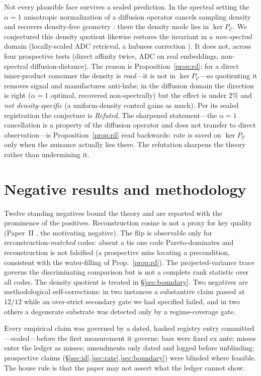 \documentclass[lettersize,onecolumn]{IEEEtran}
\theoremstyle{definition}
\theoremstyle{remark}
\newcommand{\PC}{P_{\mathcal{C}}}
\begin{document}
Not every plausible face survives a sealed prediction. In the spectral setting the
$\alpha{=}1$ anisotropic normalization of a diffusion operator cancels sampling
density and recovers density-free geometry \cite{coifman2006}: there the density mode
lies in $\ker\PC$. We conjectured this density quotient likewise restores the
invariant in a \emph{non-spectral} domain (locally-scaled ADC retrieval, a hubness
correction \cite{radovanovic2010}). It does not, across four prospective tests
(direct affinity twice, ADC on real embeddings, non-spectral diffusion-distance).
The reason is Proposition~\ref{prop:rd}: for a direct inner-product consumer the
density is \emph{read}---it is not in $\ker\PC$---so quotienting it removes signal and
manufactures anti-hubs; in the diffusion domain the direction is right ($\alpha{=}1$
optimal, recovered non-spectrally) but the effect is under $2\%$ and \emph{not
density-specific} (a uniform-density control gains as much). Per its sealed
registration the conjecture is \emph{Refuted}. The sharpened statement---the
$\alpha{=}1$ cancellation is a property of the diffusion operator and does not
transfer to direct observation---is Proposition~\ref{prop:rd} read backwards: rate is
saved on $\ker\PC$ only when the nuisance actually lies there. The refutation
sharpens the theory rather than undermining it.

\section{Negative results and methodology}\label{sec:negatives}

Twelve standing negatives bound the theory and are reported with the prominence of
the positives. Reconstruction cosine is not a proxy for key quality (Paper~II
\cite{paper2}, the motivating negative). The flip is observable only for
reconstruction-\emph{matched} codes: absent a tie one code Pareto-dominates and
reconstruction is not falsified (a prospective miss locating a precondition,
consistent with the water-filling of Prop.~\ref{prop:rd}). The projected-variance
trace governs the discriminating comparison but is not a complete rank statistic over
all codes. The density quotient is treated in \S\ref{sec:boundary}. Two negatives are
methodological self-corrections: in two instances a substantive claim passed at
$12/12$ while an over-strict secondary gate we had specified failed, and in two others
a degenerate substrate was detected only by a regime-coverage gate.

Every empirical claim was governed by a dated, hashed registry entry
committed---sealed---before the first measurement it governs; bars were fixed ex
ante; misses enter the ledger as misses; amendments only dated and logged before
unblinding; prospective claims (\S\ref{sec:id},\ref{sec:rate},\ref{sec:boundary}) were
blinded where feasible. The house rule is that the paper may not assert what the
ledger cannot show.
\end{document}
